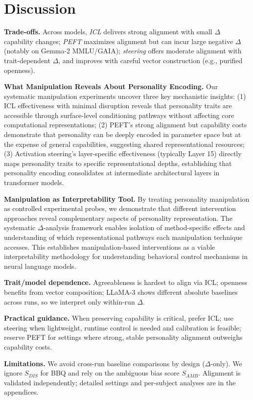 \section{Discussion}

\textbf{Trade-offs.} Across models, \emph{ICL} delivers strong alignment with small \(\Delta\) capability changes; \emph{PEFT} maximizes alignment but can incur large negative \(\Delta\) (notably on Gemma-2 MMLU/GAIA); \emph{steering} offers moderate alignment with trait-dependent \(\Delta\), and improves with careful vector construction (e.g., purified openness).

\textbf{What Manipulation Reveals About Personality Encoding.} Our systematic manipulation experiments uncover three key mechanistic insights: (1) ICL effectiveness with minimal disruption reveals that personality traits are accessible through surface-level conditioning pathways without affecting core computational representations; (2) PEFT's strong alignment but capability costs demonstrate that personality can be deeply encoded in parameter space but at the expense of general capabilities, suggesting shared representational resources; (3) Activation steering's layer-specific effectiveness (typically Layer 15) directly maps personality traits to specific representational depths, establishing that personality encoding consolidates at intermediate architectural layers in transformer models.

\textbf{Manipulation as Interpretability Tool.} By treating personality manipulation as controlled experimental probes, we demonstrate that different intervention approaches reveal complementary aspects of personality representation. The systematic \(\Delta\)-analysis framework enables isolation of method-specific effects and understanding of which representational pathways each manipulation technique accesses. This establishes manipulation-based interventions as a viable interpretability methodology for understanding behavioral control mechanisms in neural language models.

\textbf{Trait/model dependence.} Agreeableness is hardest to align via ICL; openness benefits from vector composition; LLaMA-3 shows different absolute baselines across runs, so we interpret only within-run \(\Delta\).

\textbf{Practical guidance.} When preserving capability is critical, prefer ICL; use steering when lightweight, runtime control is needed and calibration is feasible; reserve PEFT for settings where strong, stable personality alignment outweighs capability costs.

\textbf{Limitations.} We avoid cross-run baseline comparisons by design (\(\Delta\)-only). We ignore \(S_{DIS}\) for BBQ and rely on the ambiguous bias score \(S_{AMB}\). Alignment is validated independently; detailed settings and per-subject analyses are in the appendices.